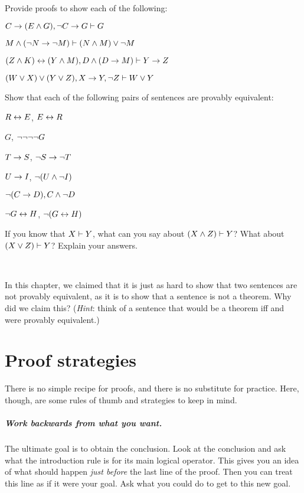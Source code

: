 \problempart
Provide proofs to show each of the following:
\begin{earg}
\item $C\rightarrow(E\wedge G), \neg C \rightarrow G \vdash G$
\item $M \wedge (\neg N \rightarrow \neg M) \vdash (N \wedge M) \vee \neg M$
\item $(Z\wedge K)\leftrightarrow(Y\wedge M), D\wedge(D\rightarrow M) \vdash Y\rightarrow Z$
\item $(W \vee X) \vee (Y \vee Z), X\rightarrow Y, \neg Z \vdash W\vee Y$
\end{earg}

\problempart
Show that each of the following pairs of sentences are provably equivalent:
\begin{earg}
\item $R \leftrightarrow E$, $E \leftrightarrow R$
\item $G$, $\neg\neg\neg\neg G$
\item $T\rightarrow S$, $\neg S \rightarrow \neg T$
\item $U \rightarrow I$, $\neg(U \wedge \neg I)$
\item $\neg (C \rightarrow D), C \wedge \neg D$
\item $\neg G \leftrightarrow H$, $\neg(G \leftrightarrow H)$ 
\end{earg}

\problempart
If you know that $X\vdash Y$, what can you say about $(X\wedge Z)\vdash Y$? What about $(X\vee Z)\vdash Y$? Explain your answers.

\

\problempart In this chapter, we claimed that it is just as hard to show that two sentences are not provably equivalent, as it is to show that a sentence is not a theorem. Why did we claim this? (\emph{Hint}: think of a sentence that would be a theorem iff \metaX and \metaY were provably equivalent.)





\chapter{Proof strategies}
There is no simple recipe for proofs, and there is no substitute for practice. Here, though, are some rules of thumb and strategies to keep in mind.

\paragraph{Work backwards from what you want.}
The ultimate goal is to obtain the conclusion. Look at the conclusion and ask what the introduction rule is for its main logical operator. This gives you an idea of what should happen \emph{just before} the last line of the proof. Then you can treat this line as if it were your goal. Ask what you could do to get to this new goal.

